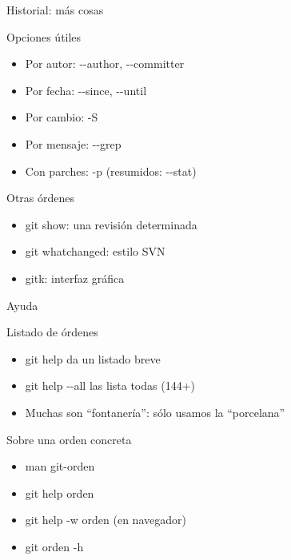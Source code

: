 \documentclass[xcolor=svgnames]{beamer}
\newcommand*{\inlinecmd}[1]{{\small\ttfamily\nohyphens{#1}}}
\begin{document}
\begin{frame}{Historial: más cosas}
  \begin{block}{Opciones útiles}
    \begin{itemize}
    \item Por autor: \inlinecmd{{-}-author, {-}-committer}
    \item Por fecha: \inlinecmd{{-}-since, {-}-until}
    \item Por cambio: \inlinecmd{-S}
    \item Por mensaje: \inlinecmd{{-}-grep}
    \item Con parches: \inlinecmd{-p} (resumidos: \inlinecmd{{-}-stat})
    \end{itemize}
  \end{block}

  \begin{block}{Otras órdenes}
    \begin{itemize}
    \item \inlinecmd{git show}: una revisión determinada
    \item \inlinecmd{git whatchanged}: estilo SVN
    \item \inlinecmd{gitk}: interfaz gráfica
    \end{itemize}
  \end{block}
\end{frame}

\begin{frame}{Ayuda}
  \begin{block}{Listado de órdenes}
    \begin{itemize}
    \item \inlinecmd{git help} da un listado breve
    \item \inlinecmd{git help {-}-all} las lista todas (144+)
    \item Muchas son \enquote{fontanería}: sólo usamos la \enquote{porcelana}
    \end{itemize}
  \end{block}

  \begin{block}{Sobre una orden concreta}
    \begin{itemize}
    \item \inlinecmd{man git-orden}
    \item \inlinecmd{git help orden}
    \item \inlinecmd{git help -w orden} (en navegador)
    \item \inlinecmd{git orden -h}
    \end{itemize}
  \end{block}
\end{frame}
\end{document}
